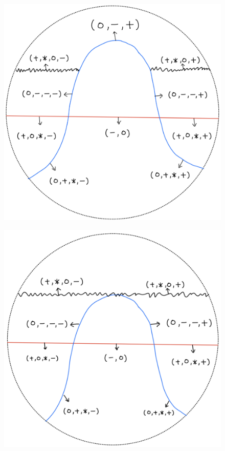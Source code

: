 \begin{definition}
\begin{enumerate}
\begin{itemize}
\begin{figure}[H]
    \centering
    \includegraphics[scale = 0.45]{diagrams/lemma2/12.png} 
    \caption{}
    \label{fig:your-label}
\end{figure}
\begin{figure}[H]
    \centering
    \includegraphics[scale = 0.45]{diagrams/lemma2/13.png} 

\end{figure}
\end{itemize}
\end{enumerate}
\end{definition}
